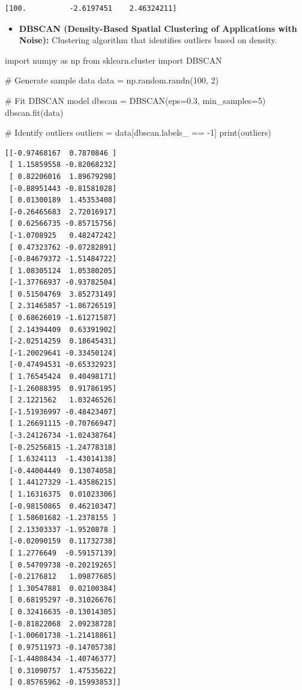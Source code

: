 \documentclass[
  letterpaper,
  DIV=11,
  numbers=noendperiod]{scrreprt}
\newenvironment{Shaded}{\begin{snugshade}}{\end{snugshade}}
\newcommand{\BuiltInTok}[1]{\textcolor[rgb]{0.00,0.23,0.31}{#1}}
\newcommand{\CommentTok}[1]{\textcolor[rgb]{0.37,0.37,0.37}{#1}}
\newcommand{\DecValTok}[1]{\textcolor[rgb]{0.68,0.00,0.00}{#1}}
\newcommand{\FloatTok}[1]{\textcolor[rgb]{0.68,0.00,0.00}{#1}}
\newcommand{\ImportTok}[1]{\textcolor[rgb]{0.00,0.46,0.62}{#1}}
\newcommand{\NormalTok}[1]{\textcolor[rgb]{0.00,0.23,0.31}{#1}}
\newcommand{\OperatorTok}[1]{\textcolor[rgb]{0.37,0.37,0.37}{#1}}
\providecommand{\tightlist}{%
  \setlength{\itemsep}{0pt}\setlength{\parskip}{0pt}}\usepackage{longtable,booktabs,array}
\begin{document}
\begin{verbatim}
[100.          -2.6197451    2.46324211]
\end{verbatim}

\begin{itemize}
\tightlist
\item
  \textbf{DBSCAN (Density-Based Spatial Clustering of Applications with
  Noise):} Clustering algorithm that identifies outliers based on
  density.
\end{itemize}

\begin{Shaded}
\begin{Highlighting}[]
\ImportTok{import}\NormalTok{ numpy }\ImportTok{as}\NormalTok{ np}
\ImportTok{from}\NormalTok{ sklearn.cluster }\ImportTok{import}\NormalTok{ DBSCAN}

\CommentTok{\# Generate sample data}
\NormalTok{data }\OperatorTok{=}\NormalTok{ np.random.randn(}\DecValTok{100}\NormalTok{, }\DecValTok{2}\NormalTok{)}

\CommentTok{\# Fit DBSCAN model}
\NormalTok{dbscan }\OperatorTok{=}\NormalTok{ DBSCAN(eps}\OperatorTok{=}\FloatTok{0.3}\NormalTok{, min\_samples}\OperatorTok{=}\DecValTok{5}\NormalTok{)}
\NormalTok{dbscan.fit(data)}

\CommentTok{\# Identify outliers}
\NormalTok{outliers }\OperatorTok{=}\NormalTok{ data[dbscan.labels\_ }\OperatorTok{==} \OperatorTok{{-}}\DecValTok{1}\NormalTok{]}
\BuiltInTok{print}\NormalTok{(outliers)}
\end{Highlighting}
\end{Shaded}

\begin{verbatim}
[[-0.97468167  0.7870846 ]
 [ 1.15859558 -0.82068232]
 [ 0.82206016  1.89679298]
 [-0.88951443 -0.81581028]
 [ 0.01300189  1.45353408]
 [-0.26465683  2.72016917]
 [ 0.62566735 -0.85715756]
 [-1.0708925   0.48247242]
 [ 0.47323762 -0.07282891]
 [-0.84679372 -1.51484722]
 [ 1.08305124  1.05380205]
 [-1.37766937 -0.93782504]
 [ 0.51504769  3.85273149]
 [ 2.31465857 -1.86726519]
 [ 0.68626019 -1.61271587]
 [ 2.14394409  0.63391902]
 [-2.02514259  0.18645431]
 [-1.20029641 -0.33450124]
 [-0.47494531 -0.65332923]
 [ 1.76545424  0.40498171]
 [-1.26088395  0.91786195]
 [ 2.1221562   1.03246526]
 [-1.51936997 -0.48423407]
 [ 1.26691115 -0.70766947]
 [-3.24126734 -1.02438764]
 [-0.25256815 -1.24778318]
 [ 1.6324113  -1.43014138]
 [-0.44004449  0.13074058]
 [ 1.44127329 -1.43586215]
 [ 1.16316375  0.01023306]
 [-0.98150865  0.46210347]
 [ 1.58601682 -1.2378155 ]
 [ 2.13303337 -1.9520878 ]
 [-0.02090159  0.11732738]
 [ 1.2776649  -0.59157139]
 [ 0.54709738 -0.20219265]
 [-0.2176812   1.09877685]
 [ 1.30547881  0.02100384]
 [ 0.68195297 -0.31026676]
 [ 0.32416635 -0.13014305]
 [-0.81822068  2.09238728]
 [-1.00601738 -1.21418861]
 [ 0.97511973 -0.14705738]
 [-1.44808434 -1.40746377]
 [ 0.31090757  1.47535622]
 [ 0.85765962 -0.15993853]]
\end{verbatim}
\end{document}
